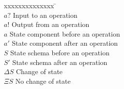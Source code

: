 \begin{tabbing}
xxxxxxxxxxxxxx \= \kill \\ 
$a?$ \> Input to an operation \\
$a!$ \> Output from an operation \\
$a$ \> State component before an operation \\
$a'$ \> State component after an operation \\
$S$ \> State schema before an operation \\
$S'$ \> State schema after an operation \\
$\Delta S$ \> Change of state \\
$\Xi S$ \> No change of state \\
\end{tabbing}



